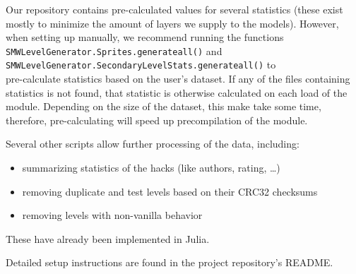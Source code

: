 Our repository contains pre-calculated values for several statistics
(these exist mostly to minimize the amount of layers we supply to the
models). However, when setting up manually, we recommend running the
functions \\
\texttt{SMWLevelGenerator.Sprites.generateall()} and \\
\texttt{SMWLevelGenerator.SecondaryLevelStats.generateall()} to \\
pre-calculate statistics based on the user's dataset. If any of the
files containing statistics is not found, that statistic is otherwise
calculated on each load of the module. Depending on the size of the
dataset, this make take some time, therefore, pre-calculating will
speed up precompilation of the module.
\medskip

Several other scripts allow further processing of the data, including:
\begin{itemize}
\item summarizing statistics of the hacks (like authors, rating,
  \dots)
\item removing duplicate and test levels based on their CRC32
  checksums
\item removing levels with non-vanilla behavior
\end{itemize}
These have already been implemented in Julia.

Detailed setup instructions are found in the project repository's
README.


